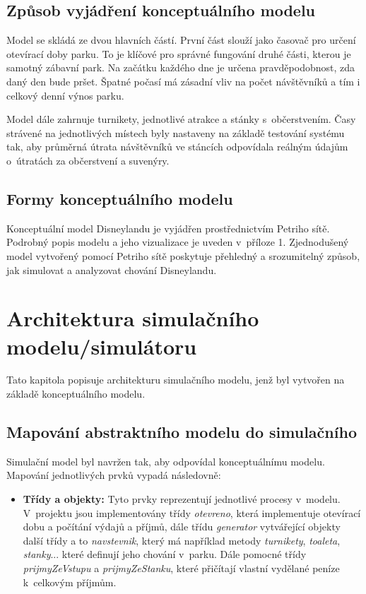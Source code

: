 \section{Způsob vyjádření konceptuálního modelu} 
Model se skládá ze dvou hlavních částí. První část slouží jako časovač pro určení otevírací doby parku. To je klíčové pro správné fungování druhé části, kterou je samotný zábavní park. Na začátku každého dne je určena pravděpodobnost, zda daný den bude pršet. Špatné počasí má zásadní vliv na počet návštěvníků a tím i celkový denní výnos parku.

Model dále zahrnuje turnikety, jednotlivé atrakce a stánky s~občerstvením. Časy strávené na jednotlivých místech byly nastaveny na základě testování systému tak, aby průměrná útrata návštěvníků ve stáncích odpovídala reálným údajům o~útratách za občerstvení a suvenýry.

\section{Formy konceptuálního modelu} Konceptuální model Disneylandu je vyjádřen prostřednictvím Petriho sítě. Podrobný popis modelu a jeho vizualizace je uveden v~příloze 1. Zjednodušený model vytvořený pomocí Petriho sítě poskytuje přehledný a srozumitelný způsob, jak simulovat a analyzovat chování Disneylandu.

\chapter{Architektura simulačního modelu/simulátoru} 
Tato kapitola popisuje architekturu simulačního modelu, jenž byl vytvořen na základě konceptuálního modelu.

\section{Mapování abstraktního modelu do simulačního} 
Simulační model byl navržen tak, aby odpovídal konceptuálnímu modelu. Mapování jednotlivých prvků vypadá následovně:

\begin{itemize} \item \textbf{Třídy a objekty:} Tyto prvky reprezentují jednotlivé procesy v~modelu. V~projektu jsou implementovány třídy \textit{otevreno}, která implementuje otevírací dobu a počítání výdajů a příjmů, dále třídu \textit{generator} vytvářející objekty další třídy a to \textit{navstevnik}, který má například metody \textit{turnikety},  \textit{toaleta}, \textit{stanky}... které definují jeho chování v~parku.
Dále pomocné třídy \textit{prijmyZeVstupu} a \textit{prijmyZeStanku}, které přičítají vlastní vydělané peníze k~celkovým příjmům. 
 \end{itemize}

